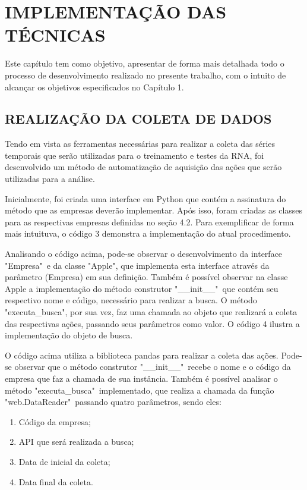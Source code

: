 
\chapter{IMPLEMENTAÇÃO DAS TÉCNICAS}\label{ch:implementacao}
Este capítulo tem como objetivo, apresentar de forma mais detalhada todo o processo de desenvolvimento realizado no presente trabalho, com o intuito de alcançar os objetivos especificados no Capítulo 1.

\section{REALIZAÇÃO DA COLETA DE DADOS}
Tendo em vista as ferramentas necessárias para realizar a coleta das séries temporais que serão utilizadas para o treinamento e testes da RNA, foi desenvolvido um método de automatização de aquisição das ações que serão utilizadas para a análise.

Inicialmente, foi criada uma interface em Python que contém a assinatura do método que as empresas deverão implementar. Após isso, foram criadas as classes para as respectivas empresas definidas no seção 4.2. Para exemplificar de forma mais intuituva, o código 3 demonstra a implementação do atual procedimento. 
\codigoPython\


Analisando o código acima, pode-se observar o desenvolvimento da interface "Empresa"\, e da classe "Apple", que implementa esta interface através da parâmetro (Empresa) em sua definição. Também é possível observar na classe Apple a implementação do método construtor "\_\_init\_\_"\, que contém seu respectivo nome e código, necessário para realizar a busca. O método "executa\_busca", por sua vez, faz uma chamada ao objeto que realizará a coleta das respectivas ações, passando seus parâmetros como valor. O código 4 ilustra a implementação do objeto de busca.
\codigoPython\


O código acima utiliza a biblioteca pandas para realizar a coleta das ações. Pode-se observar que o método construtor "\_\_init\_\_"\, recebe o nome e o código da empresa que faz a chamada de sua instância. Também é possível analisar o método "executa\_busca"\, implementado, que realiza a chamada da função "web.DataReader"\,
passando quatro parâmetros, sendo eles:
\begin{enumerate}
\item Código da empresa;
\item API que será realizada a busca;
\item Data de inicial da coleta;
\item Data final da coleta.
\end{enumerate}

